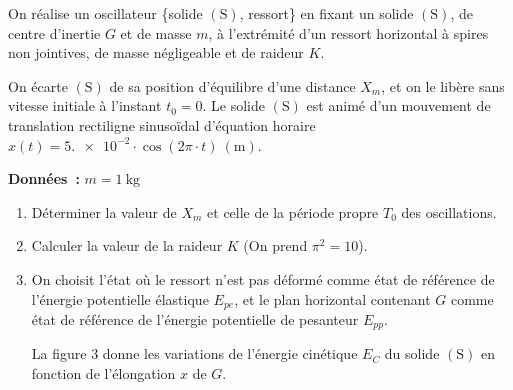 On réalise un oscillateur \{solide $\mathrm{(S)}$, ressort\} en fixant un solide
$\mathrm{(S)}$, de centre d'inertie $G$ et de masse $m$, à l'extrémité d'un
ressort horizontal à spires non jointives, de masse négligeable et de raideur
$K$.

On écarte $\mathrm{(S)}$ de sa position d'équilibre d'une distance $X_{m}$, et
on le libère sans vitesse initiale à l'instant $t_{0}=0$. Le solide
$\mathrm{(S)}$ est animé d'un mouvement de translation rectiligne sinusoïdal
d'équation horaire ${x(t)=\num{5.e-2}\cdot\cos(2\pi\cdot t)~(\unit{\m})}$.

\begin{minipage}{0.64\linewidth}
    \textbf{Données~:} $m=\qty{1}{\kg}$
    \begin{enumerate}[series=x]
        \item Déterminer la valeur de $X_{m}$ et celle de la période propre
              $T_{0}$ des oscillations.
        \item Calculer la valeur de la raideur $K$ (On prend $\pi^{2}=10$).
        \item On choisit l'état où le ressort n'est pas déformé comme état de
              référence de l'énergie potentielle élastique $E_{pe}$, et le plan
              horizontal contenant $G$ comme état de référence de l'énergie
              potentielle de pesanteur $E_{pp}$.
    
              La figure 3 donne les variations de l'énergie cinétique $E_{C}$ du
              solide $\mathrm{(S)}$ en fonction de l'élongation $x$ de $G$.
    \end{enumerate}
\end{minipage}
\hfill
\begin{minipage}{0.34\linewidth}
    \begin{figure}[H]
        \centering
        \caption{}
        \label{fig:2bac_svt_national_2025_rattrapage_phys_ex3_3}
    \end{figure}
\end{minipage}

